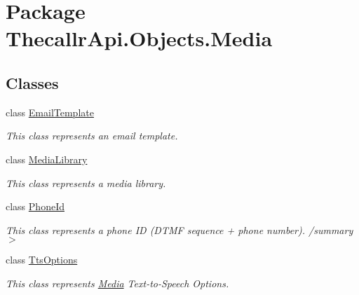 \hypertarget{namespace_thecallr_api_1_1_objects_1_1_media}{\section{Package Thecallr\+Api.\+Objects.\+Media}
\label{namespace_thecallr_api_1_1_objects_1_1_media}
}
\subsection*{Classes}
\begin{DoxyCompactItemize}
\item 
class \hyperlink{class_thecallr_api_1_1_objects_1_1_media_1_1_email_template}{Email\+Template}
\begin{DoxyCompactList}\small\item\em This class represents an email template. \end{DoxyCompactList}\item 
class \hyperlink{class_thecallr_api_1_1_objects_1_1_media_1_1_media_library}{Media\+Library}
\begin{DoxyCompactList}\small\item\em This class represents a media library. \end{DoxyCompactList}\item 
class \hyperlink{class_thecallr_api_1_1_objects_1_1_media_1_1_phone_id}{Phone\+Id}
\begin{DoxyCompactList}\small\item\em This class represents a phone I\+D (D\+T\+M\+F sequence + phone number). /summary$>$ \end{DoxyCompactList}\item 
class \hyperlink{class_thecallr_api_1_1_objects_1_1_media_1_1_tts_options}{Tts\+Options}
\begin{DoxyCompactList}\small\item\em This class represents \hyperlink{namespace_thecallr_api_1_1_objects_1_1_media}{Media} Text-\/to-\/\+Speech Options. \end{DoxyCompactList}\end{DoxyCompactItemize}
